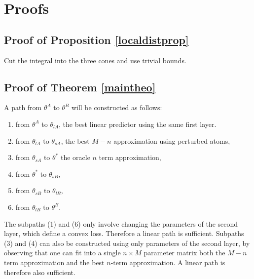 \section{Proofs}

\subsection{Proof of Proposition \ref{localdistprop}}
Cut the integral into the three cones
and use trivial bounds. 


\subsection{Proof of Theorem \ref{maintheo}}

A path from $\theta^A$ to $\theta^B$ will be constructed 
as follows:
\begin{enumerate}
\item from $\theta^A$ to $\theta_{lA}$, the 
best linear predictor using the same first layer. 
\item from $\theta_{lA}$ to $\theta_{sA}$, the best $M-n$ approximation using perturbed 
atoms, 
\item from $\theta_{sA}$ to $\theta^*$ the oracle $n$ term approximation,  
\item from $\theta^*$ to $\theta_{sB}$,
\item from $\theta_{sB}$ to $\theta_{lB}$,
\item from $\theta_{lB}$ to $\theta^{B}$.
\end{enumerate}
The subpaths (1) and (6) only involve changing the parameters of the second layer, 
which define a convex loss. Therefore a linear path is sufficient.
Subpaths (3) and (4) can also be constructed using only parameters of the second layer, 
by observing that one can fit into a single $n \times M$ parameter matrix both the 
$M-n$ term approximation and the best $n$-term approximation. A linear path is therefore 
also sufficient. 

